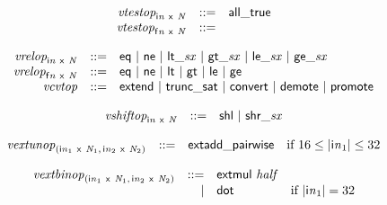 $$
\begin{array}{@{}lrrl@{}l@{}}
& {{\mathit{vtestop}}}_{{\mathsf{i}}{{\mathit{n}}}~\mathsf{x}~{\mathit{N}}} &::=& \mathsf{all\_true} \\
& {{\mathit{vtestop}}}_{{\mathsf{f}}{{\mathit{n}}}~\mathsf{x}~{\mathit{N}}} &::=&  \\
\end{array}
$$

$$
\begin{array}{@{}lrrl@{}l@{}}
& {{\mathit{vrelop}}}_{{\mathsf{i}}{{\mathit{n}}}~\mathsf{x}~{\mathit{N}}} &::=& \mathsf{eq} ~|~ \mathsf{ne} ~|~ {\mathsf{lt\_}}{{\mathit{sx}}} ~|~ {\mathsf{gt\_}}{{\mathit{sx}}} ~|~ {\mathsf{le\_}}{{\mathit{sx}}} ~|~ {\mathsf{ge\_}}{{\mathit{sx}}} \\
& {{\mathit{vrelop}}}_{{\mathsf{f}}{{\mathit{n}}}~\mathsf{x}~{\mathit{N}}} &::=& \mathsf{eq} ~|~ \mathsf{ne} ~|~ \mathsf{lt} ~|~ \mathsf{gt} ~|~ \mathsf{le} ~|~ \mathsf{ge} \\
& {\mathit{vcvtop}} &::=& \mathsf{extend} ~|~ \mathsf{trunc\_sat} ~|~ \mathsf{convert} ~|~ \mathsf{demote} ~|~ \mathsf{promote} \\
\end{array}
$$

$$
\begin{array}{@{}lrrl@{}l@{}}
& {{\mathit{vshiftop}}}_{{\mathsf{i}}{{\mathit{n}}}~\mathsf{x}~{\mathit{N}}} &::=& \mathsf{shl} ~|~ {\mathsf{shr\_}}{{\mathit{sx}}} \\
\end{array}
$$

$$
\begin{array}{@{}lrrl@{}l@{}}
& {{\mathit{vextunop}}}_{({{\mathsf{i}}{{\mathit{n}}}}_{{1}}~\mathsf{x}~{\mathit{N}}_{{1}},\, {{\mathsf{i}}{{\mathit{n}}}}_{{2}}~\mathsf{x}~{\mathit{N}}_{{2}})} &::=& \mathsf{extadd\_pairwise} &\quad
  \mbox{if}~16 \leq {|{{\mathsf{i}}{{\mathit{n}}}}_{{1}}|} \leq 32 \\
\end{array}
$$

$$
\begin{array}{@{}lrrl@{}l@{}}
& {{\mathit{vextbinop}}}_{({{\mathsf{i}}{{\mathit{n}}}}_{{1}}~\mathsf{x}~{\mathit{N}}_{{1}},\, {{\mathsf{i}}{{\mathit{n}}}}_{{2}}~\mathsf{x}~{\mathit{N}}_{{2}})} &::=& \mathsf{extmul}~{\mathit{half}} \\ &&|&
\mathsf{dot} &\quad
  \mbox{if}~{|{{\mathsf{i}}{{\mathit{n}}}}_{{1}}|} = 32 \\
\end{array}
$$

